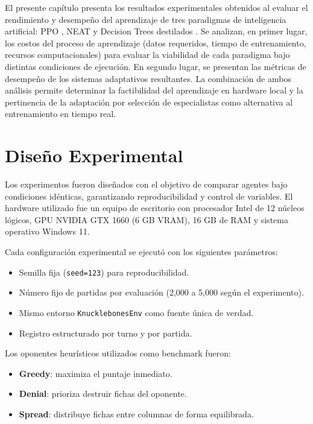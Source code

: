 El presente capítulo presenta los resultados experimentales obtenidos al evaluar el rendimiento y desempeño del aprendizaje de tres paradigmas de inteligencia artificial: PPO \cite{schulman2017ppo}, NEAT \cite{stanley2002neat} y Decision Trees destilados \cite{breiman1984classification}. Se analizan, en primer lugar, los costos del proceso de aprendizaje (datos requeridos, tiempo de entrenamiento, recursos computacionales) para evaluar la viabilidad de cada paradigma bajo distintas condiciones de ejecución. En segundo lugar, se presentan las métricas de desempeño de los sistemas adaptativos resultantes. La combinación de ambos análisis permite determinar la factibilidad del aprendizaje en hardware local y la pertinencia de la adaptación por selección de especialistas como alternativa al entrenamiento en tiempo real.

\section{Diseño Experimental}

Los experimentos fueron diseñados con el objetivo de comparar agentes bajo condiciones idénticas, garantizando reproducibilidad y control de variables. El hardware utilizado fue un equipo de escritorio con procesador Intel de 12 núcleos lógicos, GPU NVIDIA GTX 1660 (6 GB VRAM), 16 GB de RAM y sistema operativo Windows 11.

Cada configuración experimental se ejecutó con los siguientes parámetros:

\begin{itemize}
    \item Semilla fija (\texttt{seed=123}) para reproducibilidad.
    \item Número fijo de partidas por evaluación (2,000 a 5,000 según el experimento).
    \item Mismo entorno \texttt{KnucklebonesEnv} como fuente única de verdad.
    \item Registro estructurado por turno y por partida.
\end{itemize}

Los oponentes heurísticos utilizados como benchmark fueron:

\begin{itemize}
    \item \textbf{Greedy}: maximiza el puntaje inmediato.
    \item \textbf{Denial}: prioriza destruir fichas del oponente.
    \item \textbf{Spread}: distribuye fichas entre columnas de forma equilibrada.
\end{itemize}

